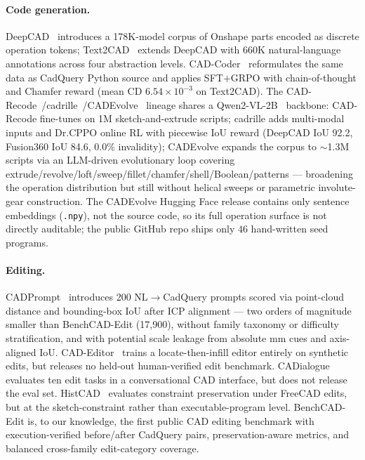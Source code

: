 \paragraph{Code generation.}
DeepCAD~\citep{Wu2021} introduces a 178K-model corpus of Onshape parts encoded as discrete operation tokens; Text2CAD~\citep{Khan2024} extends DeepCAD with 660K natural-language annotations across four abstraction levels. CAD-Coder~\citep{Guan2025} reformulates the same data as CadQuery Python source and applies SFT$+$GRPO with chain-of-thought and Chamfer reward (mean CD $6.54{\times}10^{-3}$ on Text2CAD). The CAD-Recode~\citep{Rukhovich2025}/cadrille~\citep{Kolodiazhnyi2026}/CADEvolve~\citep{Elistratov2026} lineage shares a Qwen2-VL-2B~\citep{Qwen2VL} backbone: CAD-Recode fine-tunes on 1M sketch-and-extrude scripts; cadrille adds multi-modal inputs and Dr.CPPO online RL with piecewise IoU reward (DeepCAD IoU 92.2, Fusion360 IoU 84.6, 0.0\% invalidity); CADEvolve expands the corpus to $\sim$1.3M scripts via an LLM-driven evolutionary loop covering extrude/revolve/loft/sweep/fillet/chamfer/shell/Boolean/patterns --- broadening the operation distribution but still without helical sweeps or parametric involute-gear construction. The CADEvolve Hugging Face release contains only sentence embeddings (\texttt{.npy}), not the source code, so its full operation surface is not directly auditable; the public GitHub repo ships only $46$ hand-written seed programs.


\paragraph{Editing.}
CADPrompt~\citep{Alrashedy2025} introduces 200 NL$\to$CadQuery prompts scored via point-cloud distance and bounding-box IoU after ICP alignment --- two orders of magnitude smaller than BenchCAD-Edit (17{,}900), without family taxonomy or difficulty stratification, and with potential scale leakage from absolute mm cues and axis-aligned IoU. CAD-Editor~\citep{CADEditor2025} trains a locate-then-infill editor entirely on synthetic edits, but releases no held-out human-verified edit benchmark. CADialogue~\citep{CADialogue2025} evaluates ten edit tasks in a conversational CAD interface, but does not release the eval set. HistCAD~\citep{Dong2026} evaluates constraint preservation under FreeCAD edits, but at the sketch-constraint rather than executable-program level. BenchCAD-Edit is, to our knowledge, the first public CAD editing benchmark with execution-verified before/after CadQuery pairs, preservation-aware metrics, and balanced cross-family edit-category coverage.

